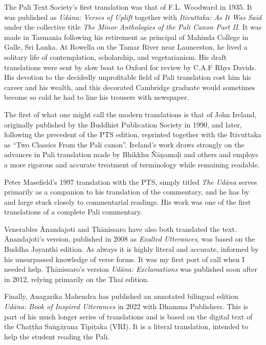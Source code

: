 \documentclass[12pt,openany]{book}%
\begin{document}
The Pali Text Society’s first translation was that of F.L. Woodward in 1935. It was published as \textit{\textsanskrit{Udāna}: Verses of Uplift} together with \textit{Itivuttaka: As It Was Said} under the collective title \textit{The Minor Anthologies of the Pali Canon Part II}. It was made in Tasmania following his retirement as principal of Mahinda College in Galle, Sri Lanka. At Rowella on the Tamar River near Launceston, he lived a solitary life of contemplation, scholarship, and vegetarianism. His draft translations were sent by slow boat to Oxford for review by C.A.F Rhys Davids. His devotion to the decidedly unprofitable field of Pali translation cost him his career and his wealth, and this decorated Cambridge graduate would sometimes become so cold he had to line his trousers with newspaper. 

The first of what one might call the modern translations is that of John Ireland, originally published by the Buddhist Publication Society in 1990, and later, following the precedent of the PTS edition, reprinted together with the Itivuttaka as “Two Classics From the Pali canon”. Ireland’s work draws strongly on the advances in Pali translation made by Bhikkhu \textsanskrit{Ñāṇamoḷi} and others and employs a more rigorous and accurate treatment of terminology while remaining readable. 

Peter Masefield’s 1997 translation with the PTS, simply titled \textit{The \textsanskrit{Udāna}} serves primarily as a companion to his translation of the commentary, and he has by and large stuck closely to commentarial readings. His work was one of the first translations of a complete Pali commentary.

Venerables Ānandajoti and \textsanskrit{Ṭhānissaro} have also both translated the text. Ānandajoti’s version, published in 2008 as \textit{Exalted Utterances}, was based on the Buddha Jayanthi edition. As always it is highly literal and accurate, informed by his unsurpassed knowledge of verse forms. It was my first port of call when I needed help. \textsanskrit{Ṭhānissaro}’s version \textit{\textsanskrit{Udāna}: Exclamations} was published soon after in 2012, relying primarily on the Thai edition.

Finally, Anagarika Mahendra has published an annotated bilingual edition \textit{\textsanskrit{Udāna}: Book of Inspired Utterances} in 2022 with Dhamma Publishers. This is part of his much longer series of translations and is based on the digital text of the \textsanskrit{Chaṭṭha} \textsanskrit{Saṅgāyana} \textsanskrit{Tipiṭaka} (VRI). It is a literal translation, intended to help the student reading the Pali.
\end{document}
